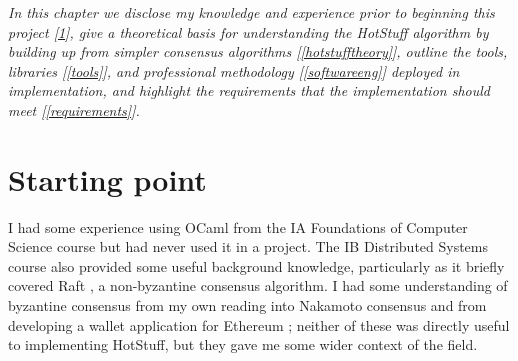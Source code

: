 




\textit{In this chapter we disclose my knowledge and experience prior to beginning this project [\ref{start}], give a theoretical basis for understanding the HotStuff algorithm by building up from simpler consensus algorithms [\ref{hotstufftheory}], outline the tools, libraries [\ref{tools}], and professional methodology [\ref{softwareeng}] deployed in implementation, and highlight the requirements that the implementation should meet [\ref{requirements}].}

\section{Starting point} \label{start}
I had some experience using OCaml from the IA Foundations of Computer Science course but had never used it in a project. The IB Distributed Systems course also provided some useful background knowledge, particularly as it briefly covered Raft \cite{ongaro_search_nodate}, a non-byzantine consensus algorithm. I had some understanding of byzantine consensus from my own reading into Nakamoto consensus \cite{nakamoto_bitcoin_nodate} and from developing a wallet application for Ethereum \cite{wood_ethereum_nodate}; neither of these was directly useful to implementing HotStuff, but they gave me some wider context of the field.

